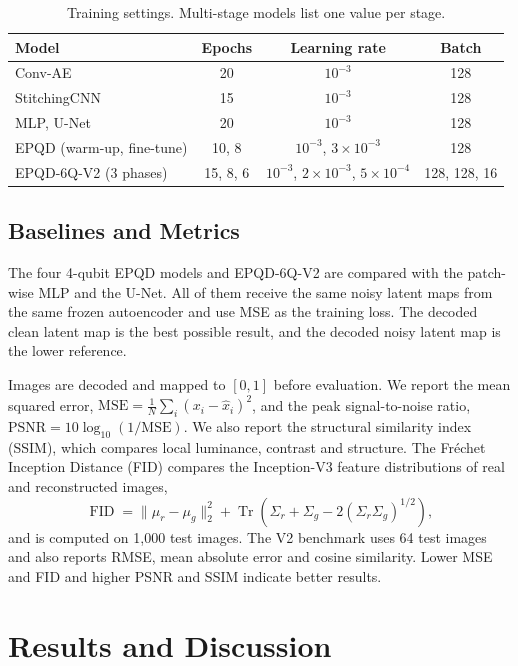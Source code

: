 \documentclass[runningheads]{llncs}
\begin{document}
\begin{table}[t]
\centering
\caption{Training settings. Multi-stage models list one value per stage.}
\label{tab:hyper}
\begin{tabular}{lccc}
\toprule
\textbf{Model} & \textbf{Epochs} & \textbf{Learning rate} & \textbf{Batch}\\
\midrule
Conv-AE & 20 & $10^{-3}$ & 128\\
StitchingCNN & 15 & $10^{-3}$ & 128\\
MLP, U-Net & 20 & $10^{-3}$ & 128\\
EPQD (warm-up, fine-tune) & 10, 8 & $10^{-3}$, $3\times10^{-3}$ & 128\\
EPQD-6Q-V2 (3 phases) & 15, 8, 6 & $10^{-3}$, $2\times10^{-3}$, $5\times10^{-4}$ & 128, 128, 16\\
\bottomrule
\end{tabular}
\end{table}

\subsection{Baselines and Metrics}
The four 4-qubit EPQD models and EPQD-6Q-V2 are compared with the patch-wise MLP and the U-Net. All of them receive the same noisy latent maps from the same frozen autoencoder and use MSE as the training loss. The decoded clean latent map is the best possible result, and the decoded noisy latent map is the lower reference.

Images are decoded and mapped to $[0,1]$ before evaluation. We report the mean squared error, $\mathrm{MSE}=\frac{1}{N}\sum_i(x_i-\hat x_i)^2$, and the peak signal-to-noise ratio, $\mathrm{PSNR}=10\log_{10}(1/\mathrm{MSE})$. We also report the structural similarity index (SSIM), which compares local luminance, contrast and structure. The Fr\'echet Inception Distance (FID) compares the Inception-V3 feature distributions of real and reconstructed images,
\begin{equation}
    \operatorname{FID}=\|\mu_r-\mu_g\|_2^2+
    \operatorname{Tr}\!\left(\Sigma_r+\Sigma_g-2(\Sigma_r\Sigma_g)^{1/2}\right),
\end{equation}
and is computed on 1{,}000 test images. The V2 benchmark uses 64 test images and also reports RMSE, mean absolute error and cosine similarity. Lower MSE and FID and higher PSNR and SSIM indicate better results.

\section{Results and Discussion}\label{sec:results}
\end{document}
